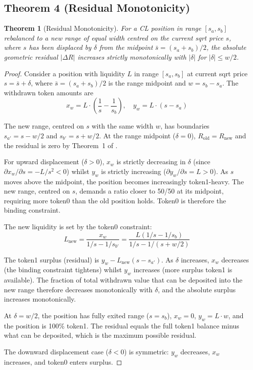 \documentclass[11pt,a4paper]{article}
\newtheorem{theorem}{Theorem}
\theoremstyle{definition}
\begin{document}
\subsection{Theorem 4 (Residual Monotonicity)}

\begin{theorem}[Residual Monotonicity]
For a CL position in range $[s_a, s_b]$ rebalanced to a new range of equal width centred on the current sqrt price $s$, where $s$ has been displaced by $\delta$ from the midpoint $\bar{s} = (s_a + s_b)/2$, the absolute geometric residual $|\Delta R|$ increases strictly monotonically with $|\delta|$ for $|\delta| \leq w/2$.
\end{theorem}

\begin{proof}
Consider a position with liquidity $L$ in range $[s_a, s_b]$ at current sqrt price $s = \bar{s} + \delta$, where $\bar{s} = (s_a + s_b)/2$ is the range midpoint and $w = s_b - s_a$. The withdrawn token amounts are
\begin{equation}
x_w = L \cdot \left(\frac{1}{s} - \frac{1}{s_b}\right), \quad y_w = L \cdot (s - s_a)
\end{equation}

The new range, centred on $s$ with the same width $w$, has boundaries $s_{a'} = s - w/2$ and $s_{b'} = s + w/2$. At the range midpoint ($\delta = 0$), $R_{\text{old}} = R_{\text{new}}$ and the residual is zero by Theorem~1 of \citet{ryan2026a}.

For upward displacement ($\delta > 0$), $x_w$ is strictly decreasing in $\delta$ (since $\partial x_w / \partial s = -L/s^2 < 0$) whilst $y_w$ is strictly increasing ($\partial y_w / \partial s = L > 0$). As $s$ moves above the midpoint, the position becomes increasingly token1-heavy. The new range, centred on $s$, demands a ratio closer to 50/50 at its midpoint, requiring more token0 than the old position holds. Token0 is therefore the binding constraint.

The new liquidity is set by the token0 constraint:
\begin{equation}
L_{\text{new}} = \frac{x_w}{1/s - 1/s_{b'}} = \frac{L(1/s - 1/s_b)}{1/s - 1/(s + w/2)}
\end{equation}

The token1 surplus (residual) is $y_w - L_{\text{new}}(s - s_{a'})$. As $\delta$ increases, $x_w$ decreases (the binding constraint tightens) whilst $y_w$ increases (more surplus token1 is available). The fraction of total withdrawn value that can be deposited into the new range therefore decreases monotonically with $\delta$, and the absolute surplus increases monotonically.

At $\delta = w/2$, the position has fully exited range ($s = s_b$), $x_w = 0$, $y_w = L \cdot w$, and the position is 100\% token1. The residual equals the full token1 balance minus what can be deposited, which is the maximum possible residual.

The downward displacement case ($\delta < 0$) is symmetric: $y_w$ decreases, $x_w$ increases, and token0 enters surplus.
\end{proof}
\end{document}
